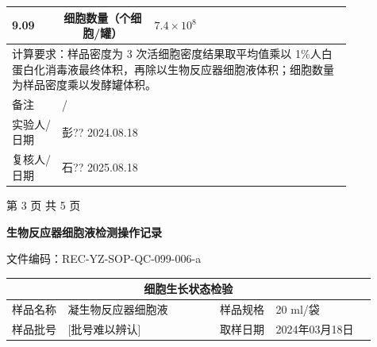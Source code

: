 \documentclass[UTF8,10pt,a4paper,fontset=fandol]{ctexart}
\newcommand{\fieldvalue}[1]{#1}
\newcommand{\handwritten}[1]{#1}
\begin{document}
\begin{minipage}{\linewidth}
\begin{tabular}{|p{0.13\linewidth}|p{0.12\linewidth}|p{0.12\linewidth}|p{0.12\linewidth}|p{0.12\linewidth}|p{0.12\linewidth}|p{0.12\linewidth}|}
\fieldvalue{\handwritten{9.09}} &
\multicolumn{2}{c|}{细胞数量（个细胞/罐）}&
\fieldvalue{\handwritten{$7.4\times10^8$}} &
\multicolumn{2}{c|}{}\\
\hline
\multicolumn{7}{|p{0.97\linewidth}|}{
计算要求：样品密度为 3 次活细胞密度结果取平均值乘以 1\%人白蛋白化消毒液最终体积，再除以生物反应器细胞液体积；细胞数量为样品密度乘以发酵罐体积。
}\\
\hline
备注&
\multicolumn{6}{l|}{
\fieldvalue{\handwritten{/}}}\\
\hline
实验人/日期&
\multicolumn{6}{l|}{
\fieldvalue{\handwritten{彭??}}
\quad
\fieldvalue{\handwritten{2024.08.18}}}\\
\hline
复核人/日期&
\multicolumn{6}{l|}{
\fieldvalue{\handwritten{石??}}
\quad
\fieldvalue{\handwritten{2025.08.18}}}\\
\hline
\end{tabular}

\end{minipage}

\begin{center}
第 3 页 共 5 页
\end{center}

\newpage

\begin{center}
\textbf{生物反应器细胞液检测操作记录}
\end{center}

\noindent 文件编码：REC-YZ-SOP-QC-099-006-a

\begin{center}
\begin{tabular}{|p{0.14\linewidth}|p{0.38\linewidth}|p{0.14\linewidth}|p{0.25\linewidth}|}
\hline
\multicolumn{4}{|c|}{细胞生长状态检验}\\
\hline
样品名称 &
\fieldvalue{凝生物反应器细胞液} &
样品规格 &
\fieldvalue{20 ml/袋}\\
\hline
样品批号 &
\fieldvalue{\handwritten{[批号难以辨认]}} &
取样日期 &
\fieldvalue{\handwritten{2024年03月18日}}\\
\hline
\end{tabular}
\end{center}
\end{document}
